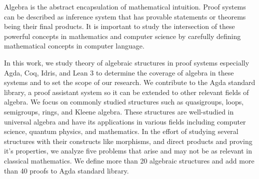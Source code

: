 Algebra is the abstract encapsulation of mathematical intuition. Proof systems
can be described as inference system that has provable statements or theorems
being their final products. It is important to study the intersection of these
powerful concepts in mathematics and computer science by carefully defining
mathematical concepts in computer language.

In this work, we study theory of algebraic structures in proof systems especially Agda,
Coq, Idris, and Lean 3 to determine the coverage of algebra in these systems and
to set the scope of our research. We contribute to the Agda standard library, a
proof assistant system so it can be extended to other relevant fields of
algebra. We focus on commonly studied structures such as quasigroups, loops,
semigroups, rings, and Kleene algebra. These structures are well-studied in
universal algebra and have its applications in various fields including computer
science, quantum physics, and mathematics. In the effort of studying several
structures with their constructs like morphisms, and direct products and proving
it's properties, we analyze five problems that arise and may not be as relevant
in classical mathematics. We define more than 20 algebraic structures and add
more than 40 proofs to Agda standard library.